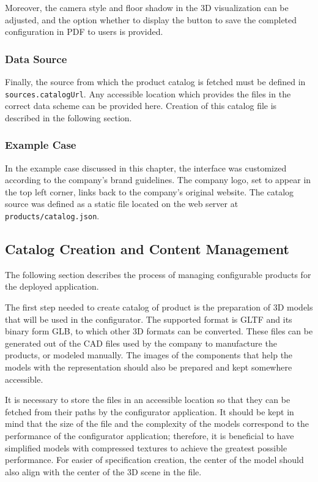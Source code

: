Moreover, the camera style and floor shadow in the 3D visualization can be adjusted, and the option whether to display the button to save the completed configuration in PDF to users is provided.


\subsubsection{Data Source}

Finally, the source from which the product catalog is fetched must be defined in \texttt{sources.catalogUrl}. Any accessible location which provides the files in the correct data scheme can be provided here. Creation of this catalog file is described in the following section.


\subsubsection{Example Case}

In the example case discussed in this chapter, the interface was customized according to the company's brand guidelines. The company logo, set to appear in the top left corner, links back to the company's original website. The catalog source was defined as a static file located on the web server at \texttt{products/catalog.json}.


\subsection{Catalog Creation and Content Management}


The following section describes the process of managing configurable products for the deployed application.

The first step needed to create catalog of product is the preparation of 3D models that will be used in the configurator. The supported format is GLTF and its binary form GLB, to which other 3D formats can be converted. These files can be generated out of the CAD files used by the company to manufacture the products, or modeled manually. The images of the components that help the models with the representation should also be prepared and kept somewhere accessible.

It is necessary to store the files in an accessible location so that they can be fetched from their paths by the configurator application. It should be kept in mind that the size of the file and the complexity of the models correspond to the performance of the configurator application; therefore, it is beneficial to have simplified models with compressed textures to achieve the greatest possible performance. For easier of specification creation, the center of the model should also align with the center of the 3D scene in the file.

